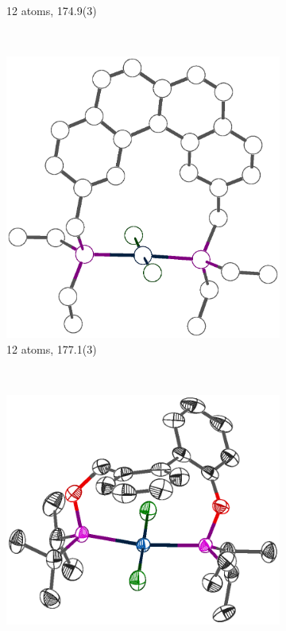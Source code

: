 \begin{figure}[htbp]
\begin{subfigure}[b]{0.4\textwidth}
                \caption{12 atoms, 174.9(3)\degrees{}\cite{Newman2012}}
                \label{CAZXIM}
        \end{subfigure}
        \\
        \begin{subfigure}[b]{0.32\textwidth}
                \includegraphics[width=\textwidth]{../Othercrystals/PtCl2/Trans/KOWHIN.eps}
                \caption{12 atoms, 177.1(3)\degrees{}\cite{Bachechi1992}}
                \label{KOWHIN}
        \end{subfigure}
        ~
        \begin{subfigure}[b]{0.32\textwidth}
                \includegraphics[width=\textwidth]{../Othercrystals/PtCl2//Trans/613904.eps}

\end{subfigure}
\end{figure}
